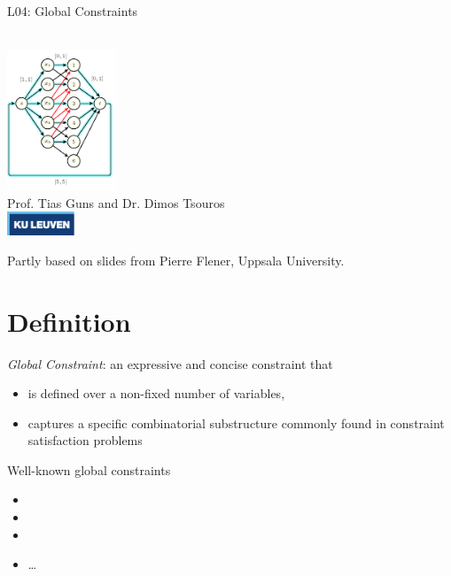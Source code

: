 \documentclass{cons-beamer}
\begin{document}
\begin{frame}{L04: Global Constraints}
  \begin{center}
    ~ \\
    \includegraphics[height=42mm]{images/flow_alldiff_only_graph.png} \\
    Prof. Tias Guns and Dr. Dimos Tsouros \\[0.5em]
    \includegraphics[width=2cm]{images/kuleuven_CMYK_logo.pdf}
  \end{center}
  
  {\footnotesize 
  Partly based on slides from Pierre Flener, Uppsala University.}
\end{frame}


\section{Definition}

\begin{frame}
  \begin{definition}
    \textit{Global Constraint}: an expressive and concise constraint that  
    \begin{itemize}
      \item is defined over a non-fixed number of variables,
      \item captures a specific combinatorial substructure commonly found in constraint satisfaction problems   
    \end{itemize}
  \end{definition} \vfill

  \begin{example}
    Well-known global constraints
    \begin{itemize}
      \item {}
      \item {}
      \item {}
      \item \dots
    \end{itemize}
  \end{example}
\end{frame}
\end{document}
